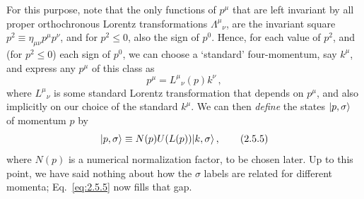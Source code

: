 For this purpose, note that the only functions of $p^\mu$ that are left
invariant by all proper orthochronous Lorentz transformations
$\Lambda^\mu{}_{\nu}$, are the invariant square
$p^2\equiv\eta_{\mu\nu}p^\mu p^\nu$, and for $p^2\leq0$, also the sign of
$p^0$. Hence, for each value of $p^2$, and (for $p^2\leq0$) each sign of
$p^0$, we can choose a `standard' four-momentum, say $k^\mu$, and express any
$p^\mu$ of this class as
\begin{equation}
p^\mu=L^\mu{}_{\nu}(p)k^\nu\,,
\tag{2.5.4}\label{eq:2.5.4}
\end{equation}
where $L^\mu{}_{\nu}$ is some standard Lorentz transformation that depends on
$p^\mu$, and also implicitly on our choice of the standard $k^\mu$. We can
then \emph{define} the states $\lvert p,\sigma\rangle$ of momentum $p$ by
\begin{equation}
\lvert p,\sigma\rangle\equiv N(p)U(L(p))\lvert k,\sigma\rangle\,,
\tag{2.5.5}\label{eq:2.5.5}
\end{equation}
where $N(p)$ is a numerical normalization factor, to be chosen later. Up to
this point, we have said nothing about how the $\sigma$ labels are related for
different momenta; Eq.~\eqref{eq:2.5.5} now fills that gap.

